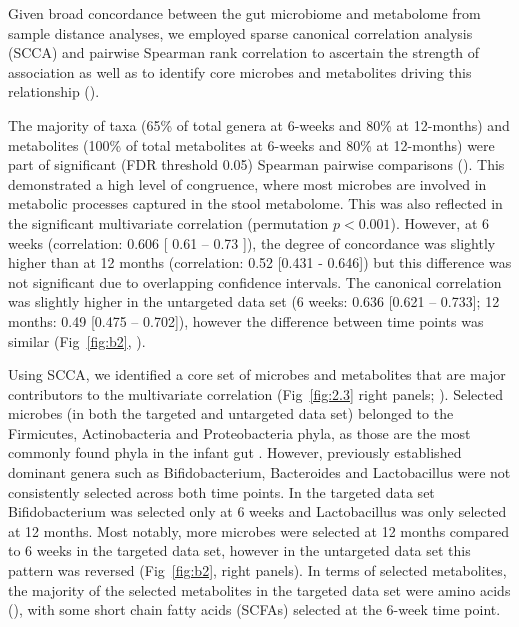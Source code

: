 Given broad concordance between the gut microbiome and metabolome from sample distance analyses, we employed sparse canonical correlation analysis (SCCA) and pairwise Spearman rank correlation to ascertain the strength of association as well as to identify core microbes and metabolites driving this relationship ().   

The majority of taxa (65\% of total genera at 6-weeks and 80\% at 12-months) and metabolites (100\% of total metabolites at 6-weeks and 80\% at 12-months) were part of significant (FDR threshold 0.05) Spearman pairwise comparisons (). This demonstrated a high level of congruence, where most microbes are involved in metabolic processes captured in the stool metabolome. This was also reflected in the significant multivariate correlation (permutation $p < 0.001$). However, at 6 weeks (correlation: 0.606 [ 0.61 -- 0.73 ]), the degree of concordance was slightly higher than at 12 months (correlation: 0.52 [0.431 - 0.646]) but this difference was not significant due to overlapping confidence intervals. The canonical correlation was slightly higher in the untargeted data set (6 weeks: 0.636 [0.621 – 0.733]; 12 months: 0.49 [0.475 – 0.702]), however the difference between time points was similar (Fig~\ref{fig:b2}, ). 

Using SCCA, we identified a core set of microbes and metabolites that are major contributors to the multivariate correlation (Fig~\ref{fig:2.3} right panels; ). Selected microbes (in both the targeted and untargeted data set) belonged to the Firmicutes, Actinobacteria and Proteobacteria phyla, as those are the most commonly found phyla in the infant gut \cite{madan2016effects, backhed2015dynamics}. However, previously established dominant genera such as Bifidobacterium, Bacteroides and Lactobacillus were not consistently selected across both time points. In the targeted data set Bifidobacterium was selected only at 6 weeks and Lactobacillus was only selected at 12 months. Most notably, more microbes were selected at 12 months compared to 6 weeks in the targeted data set, however in the untargeted data set this pattern was reversed (Fig~\ref{fig:b2}, right panels). In terms of selected metabolites, the majority of the selected metabolites in the targeted data set were amino acids (), with some short chain fatty acids (SCFAs) selected at the 6-week time point.  

